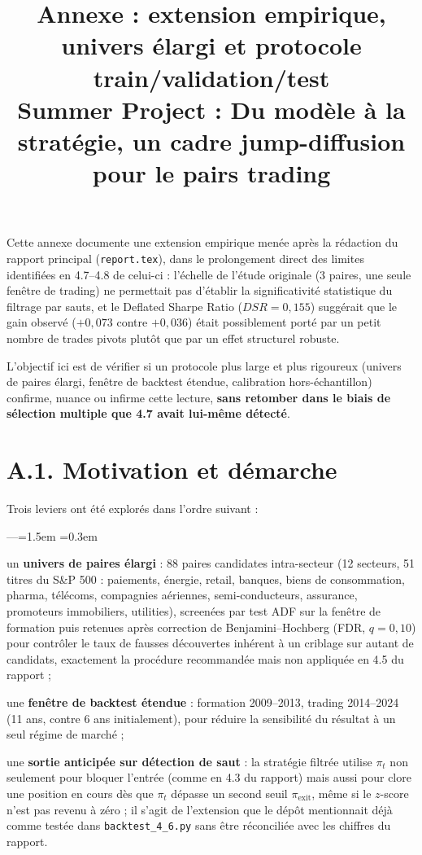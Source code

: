 \documentclass{article}
\date{}
\title{Annexe : extension empirique, univers élargi et protocole train/validation/test\\
\large Summer Project : Du modèle à la stratégie, un cadre jump-diffusion pour le pairs trading}
\begin{document}
\maketitle

Cette annexe documente une extension empirique menée après la rédaction du rapport principal (\texttt{report.tex}), dans le prolongement direct des limites identifiées en 4.7--4.8 de celui-ci : l'échelle de l'étude originale (3 paires, une seule fenêtre de trading) ne permettait pas d'établir la significativité statistique du filtrage par sauts, et le Deflated Sharpe Ratio ($DSR=0{,}155$) suggérait que le gain observé ($+0{,}073$ contre $+0{,}036$) était possiblement porté par un petit nombre de trades pivots plutôt que par un effet structurel robuste.

L'objectif ici est de vérifier si un protocole plus large et plus rigoureux (univers de paires élargi, fenêtre de backtest étendue, calibration hors-échantillon) confirme, nuance ou infirme cette lecture, \textbf{sans retomber dans le biais de sélection multiple que 4.7 avait lui-même détecté}.

\section*{A.1. Motivation et démarche}
Trois leviers ont été explorés dans l'ordre suivant :
\begin{list}{---}{\leftmargin=1.5em \itemsep=0.3em}
\item un \textbf{univers de paires élargi} : 88 paires candidates intra-secteur (12 secteurs, 51 titres du S\&P 500 : paiements, énergie, retail, banques, biens de consommation, pharma, télécoms, compagnies aériennes, semi-conducteurs, assurance, promoteurs immobiliers, utilities), screenées par test ADF sur la fenêtre de formation puis retenues après correction de Benjamini--Hochberg (FDR, $q=0{,}10$) pour contrôler le taux de fausses découvertes inhérent à un criblage sur autant de candidats, exactement la procédure recommandée mais non appliquée en 4.5 du rapport ;
\item une \textbf{fenêtre de backtest étendue} : formation 2009--2013, trading 2014--2024 (11 ans, contre 6 ans initialement), pour réduire la sensibilité du résultat à un seul régime de marché ;
\item une \textbf{sortie anticipée sur détection de saut} : la stratégie filtrée utilise $\pi_t$ non seulement pour bloquer l'entrée (comme en 4.3 du rapport) mais aussi pour clore une position en cours dès que $\pi_t$ dépasse un second seuil $\pi_{\text{exit}}$, même si le $z$-score n'est pas revenu à zéro ; il s'agit de l'extension que le dépôt mentionnait déjà comme testée dans \texttt{backtest\_4\_6.py} sans être réconciliée avec les chiffres du rapport.
\end{list}
\end{document}
